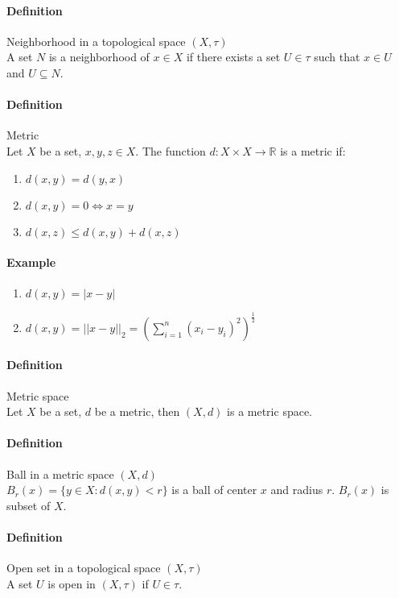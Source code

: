 \documentclass{article}
\newcommand{\abs}[1]{\left|#1\right|}
\newcommand{\R}{\mathbb{R}}
\newcommand{\Def}{\paragraph{Definition}}
\newcommand{\Example}{\paragraph{Example}}
\begin{document}
	\Def Neighborhood in a topological space $(X, \tau)$
\\A set $N$ is a neighborhood of $x \in X$ if there exists a set $U \in \tau$
	such that $x \in U$ and $U \subseteq N$.

	\Def Metric
\\Let $X$ be a set, $x, y, z \in X$. The function $d : X \times X \rightarrow
	\R$ is a metric if:
	\begin{enumerate}[label=(\roman*)]
		\item $d(x,y) = d(y,x)$
		\item $d(x,y) = 0 \iff x = y$
		\item $d(x,z) \leq d(x,y) + d(x,z)$
	\end{enumerate}

	\Example
	\begin{enumerate}[label=(\arabic*)]
		\item $d(x,y) = \abs{x - y}$
		\item $\displaystyle d(x,y) = ||x - y||_2 =
		\left(\sum_{i = 1}^n (x_i - y_i)^2\right)^{\frac{1}{2}}$
	\end{enumerate}

	\Def Metric space
\\Let $X$ be a set, $d$ be a metric, then $(X, d)$ is a metric space.

	\Def Ball in a metric space $(X, d)$
\\$B_r(x) = \{ y \in X : d(x,y) < r \}$ is a ball of center $x$ and radius $r$.
	$B_r(x)$ is subset of $X$.

	\Def Open set in a topological space $(X, \tau)$
\\A set $U$ is open in $(X, \tau)$ if $U \in \tau$.
\end{document}
